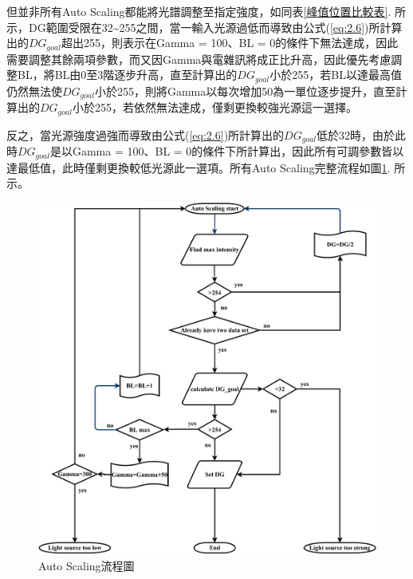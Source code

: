 \par
但並非所有Auto Scaling都能將光譜調整至指定強度，如同表\ref{峰值位置比較表}. 所示，DG範圍受限在32\textasciitilde255之間，當一輸入光源過低而導致由公式(\ref{eq:2.6})所計算出的$DG_{goal}$超出255，則表示在Gamma = 100、BL = 0的條件下無法達成，因此需要調整其餘兩項參數，而又因Gamma與電雜訊將成正比升高，因此優先考慮調整BL，將BL由0至3階逐步升高，直至計算出的$DG_{goal}$小於255，若BL以達最高值仍然無法使$DG_{goal}$小於255，則將Gamma以每次增加50為一單位逐步提升，直至計算出的$DG_{goal}$小於255，若依然無法達成，僅剩更換較強光源這一選擇。\par
反之，當光源強度過強而導致由公式(\ref{eq:2.6})所計算出的$DG_{goal}$低於32時，由於此時$DG_{goal}$是以Gamma = 100、BL = 0的條件下所計算出，因此所有可調參數皆以達最低值，此時僅剩更換較低光源此一選項。所有Auto Scaling完整流程如圖\ref{Auto Scaling流程圖}. 所示。
\newpage
\begin{figure}[H] %
	\centering %
	\setlength{\abovecaptionskip}{1cm}
	\includegraphics[width=\textwidth]{figures/Auto Scaling流程.png} %
	\caption{Auto Scaling流程圖} %
	\label{Auto Scaling流程圖} %
\end{figure}

